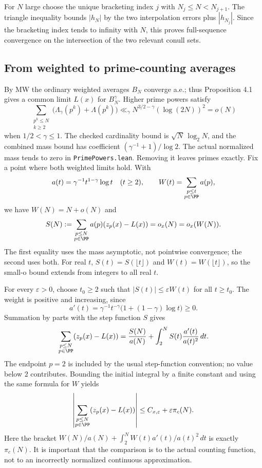 For $N$ large choose the unique bracketing index $j$ with $N_j\leq N<N_{j+1}$. The triangle inequality bounds $|h_N|$ by the two interpolation errors plus $|h_{N_j}|$. Since the bracketing index tends to infinity with $N$, this proves full-sequence convergence on the intersection of the two relevant conull sets.
\fi

\subsection*{From weighted to prime-counting averages}
By MW the ordinary weighted averages $B_N$ converge a.e.; thus Proposition 4.1 gives a common limit $L(x)$ for $B_N^\gamma$. Higher prime powers satisfy
\[
 \sum_{\substack{p^k\leq N\\k\geq2}}
 \bigl(\Lambda_\gamma(p^k)+\Lambda(p^k)\bigr)
 \ll_\gamma N^{3/2-\gamma}(\log(2N))^2=o(N)
\]
when $1/2<\gamma\leq1$. The checked cardinality bound is $\sqrt N\,\log_2N$, and the combined mass bound has coefficient $(\gamma^{-1}+1)/\log2$. The actual normalized mass tends to zero in \texttt{PrimePowers.lean}. Removing it leaves primes exactly.
\ifDetailed
Fix a point where both weighted limits hold. With
\[
 a(t)=\gamma^{-1}t^{1-\gamma}\log t\quad(t\geq2),\qquad
 W(t)=\sum_{\substack{p\leq t\\p\in\PP}}a(p),
\]
we have $W(N)=N+o(N)$ and
\[
 S(N):=\sum_{\substack{p\leq N\\p\in\PP}}a(p)(z_p(x)-L(x))=o_x(N)=o_x(W(N)).
\]
The first equality uses the mass asymptotic, not pointwise convergence; the second uses both. For real $t$, $S(t)=S(\lfloor t\rfloor)$ and $W(t)=W(\lfloor t\rfloor)$, so the small-o bound extends from integers to all real $t$.

For every $\varepsilon>0$, choose $t_0\geq2$ such that $|S(t)|\leq\varepsilon W(t)$ for all $t\geq t_0$. The weight is positive and increasing, since
\[
 a'(t)=\gamma^{-1}t^{-\gamma}\bigl(1+(1-\gamma)\log t\bigr)\geq0.
\]
Summation by parts with the step function $S$ gives
\[
 \sum_{\substack{p\leq N\\p\in\PP}}(z_p(x)-L(x))
 =\frac{S(N)}{a(N)}+\int_2^N S(t)\frac{a'(t)}{a(t)^2}\,dt.
\]
The endpoint $p=2$ is included by the usual step-function convention; no value below $2$ contributes. Bounding the initial integral by a finite constant and using the same formula for $W$ yields
\[
 \left|\sum_{\substack{p\leq N\\p\in\PP}}(z_p(x)-L(x))\right|
 \leq C_{x,\varepsilon}+\varepsilon\pi_c(N).
\]
Here the bracket $W(N)/a(N)+\int_2^N W(t)a'(t)/a(t)^2\,dt$ is exactly $\pi_c(N)$. It is important that the comparison is to the actual counting function, not to an incorrectly normalized continuous approximation.


